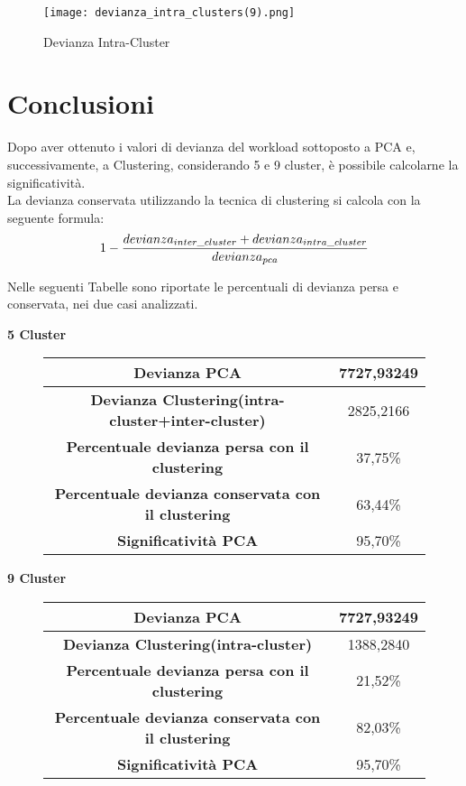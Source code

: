 \begin{figure}[!htbp]
  \centering
	\texttt{[image: devianza\_intra\_clusters(9).png]}
  \caption{Devianza Intra-Cluster}
  \label{}
\end{figure}
\clearpage
\section{Conclusioni}

Dopo aver ottenuto i valori di devianza del workload sottoposto a PCA e, successivamente,
a Clustering, considerando 5 e 9 cluster, è possibile calcolarne la significatività.\\
La devianza conservata utilizzando la tecnica di clustering si calcola con la
seguente formula:
$$1-{devianza_{inter\_cluster}+devianza_{intra\_cluster}\over {devianza_{pca}}}$$

Nelle seguenti Tabelle sono riportate le percentuali di devianza persa e conservata,
 nei due casi analizzati.\\
\vspace{5 mm}

\begin{center}
  \textbf{5 Cluster}
\end{center}
\begin{figure}[!htbp]
  \centering
  \begin{tabular}{|c|c|}
  \hline
  \textbf{Devianza PCA}	& 7727,93249 \\
  \hline
  \textbf{Devianza Clustering(intra-cluster+inter-cluster)}	& 2825,2166 \\
  \hline
  \textbf{Percentuale devianza persa con il clustering}	& 37,75\% \\
  \hline
  \textbf{Percentuale devianza conservata con il clustering}	& 63,44\% \\
  \hline
  \textbf{Significatività PCA} &	95,70\% \\
  \hline
  \end{tabular}
\end{figure}


\vspace{5 mm}
\begin{center}
  \textbf{9 Cluster}
\end{center}
\begin{figure}[!htbp]
  \centering
  \begin{tabular}{|c|c|}
    \hline
    \textbf{Devianza PCA}	& 7727,93249 \\
    \hline
    \textbf{Devianza Clustering(intra-cluster)}	& 1388,2840 \\
    \hline
    \textbf{Percentuale devianza persa con il clustering}	& 21,52\% \\
    \hline
    \textbf{Percentuale devianza conservata con il clustering}	& 82,03\% \\
    \hline
    \textbf{Significatività PCA} &	95,70\% \\
    \hline
  \end{tabular}
\end{figure}

